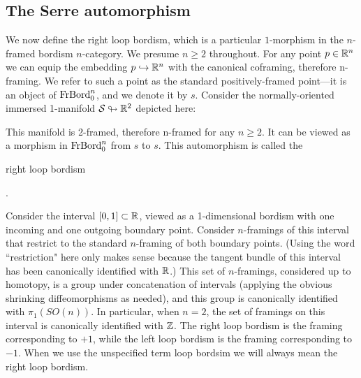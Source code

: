 \documentclass{amsart}
\begin{document}
\subsection{The Serre automorphism}
We now define the right loop bordism, which is a particular $1$-morphism in the $n$-framed bordism $n$-category.  We presume $n \geq 2$ throughout.  For any point $p \in \mathbb R^n$ we can equip the embedding $p \hookrightarrow \mathbb R^n$ with the canonical coframing, therefore n-framing.  We refer to such a point as the standard positively-framed point---it is an object of $\mathrm{FrBord}_0^n$, and we denote it by $s$.  Consider the normally-oriented immersed 1-manifold $\mathcal S \looparrowright \mathbb R^2$ depicted here:
\begin{center}
\end{center}
\nid This manifold is 2-framed, therefore n-framed for any $n \geq 2$.  It can be viewed as a morphism in $\mathrm{FrBord}_0^n$ from $s$ to $s$.  This automorphism is called the \begin{bf}right loop bordism\end{bf}.  

\begin{remark}
Consider the interval $[0,1] \subset \mathbb R$, viewed as a 1-dimensional bordism with one incoming and one outgoing boundary point.  Consider $n$-framings of this interval that restrict to the standard $n$-framing of both boundary points.  (Using the word ``restriction" here only makes sense because the tangent bundle of this interval has been canonically identified with $\mathbb R$.)  This set of $n$-framings, considered up to homotopy, is a group under concatenation of intervals (applying the obvious shrinking diffeomorphisms as needed), and this group is canonically identified with $\pi_1(SO(n))$.  In particular, when $n=2$, the set of framings on this interval is canonically identified with $\mathbb Z$.  The right loop bordism is the framing corresponding to $+1$, while the left loop bordism is the framing corresponding to $-1$.  When we use the unspecified term loop bordsim we will always mean the right loop bordism.
\end{remark}
\end{document}
